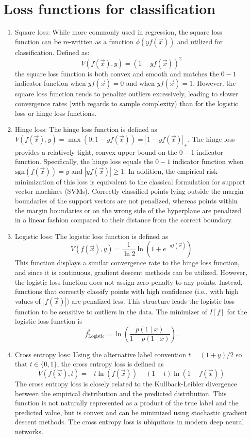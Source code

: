 \documentclass{book}
\begin{document}
\section{Loss functions for classification}
\begin{enumerate}
\item Square loss: While more commonly used in regression, the square loss function can be re-written as a function $\phi (yf({\vec {x}}))$ and utilized for classification. Defined as:
\[V(f({\vec {x}}),y)=(1-yf({\vec {x}}))^{2}\]
the square loss function is both convex and smooth and matches the $0-1$ indicator function when $yf({\vec {x}})=0$ and when $yf({\vec {x}})=1$. However, the square loss function tends to penalize outliers excessively, leading to slower convergence rates (with regards to sample complexity) than for the logistic loss or hinge loss functions.
\item Hinge loss: The hinge loss function is defined as
$V(f({\vec {x}}),y)=\max(0,1-yf({\vec {x}}))=|1-yf({\vec {x}})|_{{+}}$.
The hinge loss provides a relatively tight, convex upper bound on the $0-1$ indicator function. Specifically, the hinge loss equals the $0-1$ indicator function when $\mathrm{sgn}(f({\vec {x}}))=y$ and $|yf({\vec {x}})|\geq 1$. In addition, the empirical risk minimization of this loss is equivalent to the classical formulation for support vector machines (SVMs). Correctly classified points lying outside the margin boundaries of the support vectors are not penalized, whereas points within the margin boundaries or on the wrong side of the hyperplane are penalized in a linear fashion compared to their distance from the correct boundary.
\item Logistic loss: The logistic loss function is defined as
\[ V(f({\vec {x}}),y)={\frac {1}{\ln 2}}\ln(1+e^{{-yf({\vec {x}})}})\]
This function displays a similar convergence rate to the hinge loss function, and since it is continuous, gradient descent methods can be utilized. However, the logistic loss function does not assign zero penalty to any points. Instead, functions that correctly classify points with high confidence (i.e., with high values of $|f({\vec {x}})|)$ are penalized less. This structure leads the logistic loss function to be sensitive to outliers in the data.
The minimizer of $I[f]$ for the logistic loss function is
\[ f_{{\text{Logistic}}}^{*}=\ln \left({\frac {p(1\mid x)}{1-p(1\mid x)}}\right).\]
\item Cross entropy loss: Using the alternative label convention $t=(1+y)/2$ so that $t \in \{0,1\}$, the cross entropy loss is defined as 
\[V(f(\vec{x}),t) = -t\ln(f(\vec{x}))-(1-t)\ln(1-f(\vec{x}))\]
The cross entropy loss is closely related to the Kullback-Leibler divergence between the empirical distribution and the predicted distribution. This function is not naturally represented as a product of the true label and the predicted value, but is convex and can be minimized using stochastic gradient descent methods. The cross entropy loss is ubiquitous in modern deep neural networks. 
\end{enumerate}
\end{document}
